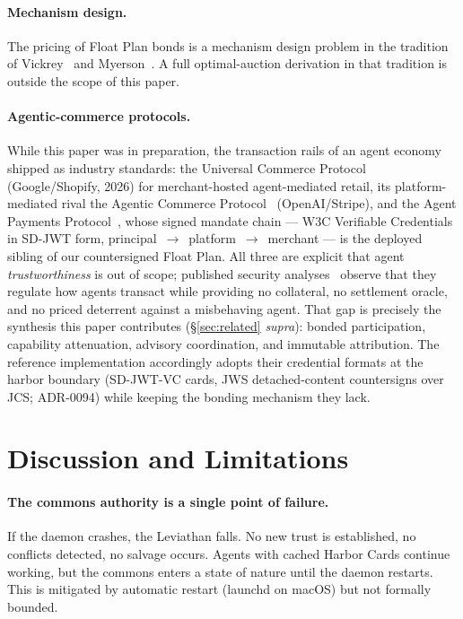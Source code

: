 \documentclass[11pt,a4paper]{article}
\theoremstyle{definition}
\theoremstyle{remark}
\begin{document}
\paragraph{Mechanism design.} The pricing of Float Plan bonds is a mechanism design problem in the tradition of Vickrey~\cite{vickrey1961counterspeculation} and Myerson~\cite{myerson1981optimal}. A full optimal-auction derivation in that tradition is outside the scope of this paper.

\paragraph{Agentic-commerce protocols.} While this paper was in preparation, the transaction rails of an agent economy shipped as industry standards: the Universal Commerce Protocol~\cite{ucp2026} (Google/Shopify, 2026) for merchant-hosted agent-mediated retail, its platform-mediated rival the Agentic Commerce Protocol~\cite{acp2025} (OpenAI/Stripe), and the Agent Payments Protocol~\cite{ap2mandates2026}, whose signed mandate chain --- W3C Verifiable Credentials in SD-JWT form, principal~$\to$~platform~$\to$~merchant --- is the deployed sibling of our countersigned Float Plan. All three are explicit that agent \emph{trustworthiness} is out of scope; published security analyses~\cite{datadome2026} observe that they regulate how agents transact while providing no collateral, no settlement oracle, and no priced deterrent against a misbehaving agent. That gap is precisely the synthesis this paper contributes (\S\ref{sec:related} \emph{supra}): bonded participation, capability attenuation, advisory coordination, and immutable attribution. The reference implementation accordingly adopts their credential formats at the harbor boundary (SD-JWT-VC cards, JWS detached-content countersigns over JCS; ADR-0094) while keeping the bonding mechanism they lack.

\section{Discussion and Limitations}\label{sec:discussion-limitations}

\paragraph{The commons authority is a single point of failure.} If the daemon crashes, the Leviathan falls. No new trust is established, no conflicts detected, no salvage occurs. Agents with cached Harbor Cards continue working, but the commons enters a state of nature until the daemon restarts. This is mitigated by automatic restart (launchd on macOS) but not formally bounded.
\end{document}
